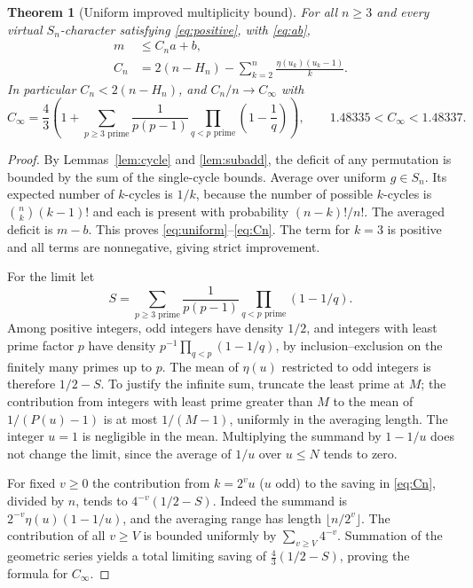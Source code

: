 \documentclass[11pt]{article}
\newtheorem{theorem}{Theorem}[section]
\theoremstyle{remark}\newtheorem{remark}[theorem]{Remark}
\begin{document}
\begin{theorem}[Uniform improved multiplicity bound]\label{thm:uniform}
For all $n\ge3$ and every virtual $S_n$-character satisfying \eqref{eq:positive}, with \eqref{eq:ab},
\begin{align}
 m&\le C_n a+b,\label{eq:uniform}\\
 C_n&=2(n-H_n)-\sum_{k=2}^n\frac{\eta(u_k)(u_k-1)}k.\label{eq:Cn}
\end{align}
In particular $C_n<2(n-H_n)$, and $C_n/n\to C_\infty$ with
\begin{equation}\label{eq:lim}
 C_\infty=\frac43\left(1+\sum_{p\ge3\text{ prime}}\frac{1}{p(p-1)}\prod_{q<p\text{ prime}}\left(1-\frac1q\right)\right),\qquad
 1.48335<C_\infty<1.48337.
\end{equation}
\end{theorem}
\begin{proof}
By Lemmas~\ref{lem:cycle} and \ref{lem:subadd}, the deficit of any permutation is bounded by the sum of the single-cycle bounds. Average over uniform $g\in S_n$. Its expected number of $k$-cycles is $1/k$, because the number of possible $k$-cycles is $\binom nk(k-1)!$ and each is present with probability $(n-k)!/n!$. The averaged deficit is $m-b$. This proves \eqref{eq:uniform}--\eqref{eq:Cn}. The term for $k=3$ is positive and all terms are nonnegative, giving strict improvement.

For the limit let
\[
 S=\sum_{p\ge3\text{ prime}}\frac1{p(p-1)}\prod_{q<p\text{ prime}}(1-1/q).
\]
Among positive integers, odd integers have density $1/2$, and integers with least prime factor $p$ have density $p^{-1}\prod_{q<p}(1-1/q)$, by inclusion--exclusion on the finitely many primes up to $p$. The mean of $\eta(u)$ restricted to odd integers is therefore $1/2-S$. To justify the infinite sum, truncate the least prime at $M$; the contribution from integers with least prime greater than $M$ to the mean of $1/(P(u)-1)$ is at most $1/(M-1)$, uniformly in the averaging length. The integer $u=1$ is negligible in the mean. Multiplying the summand by $1-1/u$ does not change the limit, since the average of $1/u$ over $u\le N$ tends to zero.

For fixed $v\ge0$ the contribution from $k=2^v u$ ($u$ odd) to the saving in \eqref{eq:Cn}, divided by $n$, tends to $4^{-v}(1/2-S)$. Indeed the summand is $2^{-v}\eta(u)(1-1/u)$, and the averaging range has length $\lfloor n/2^v\rfloor$. The contribution of all $v\ge V$ is bounded uniformly by $\sum_{v\ge V}4^{-v}$. Summation of the geometric series yields a total limiting saving of $\frac43(1/2-S)$, proving the formula for $C_\infty$.


\end{proof}
\end{document}
